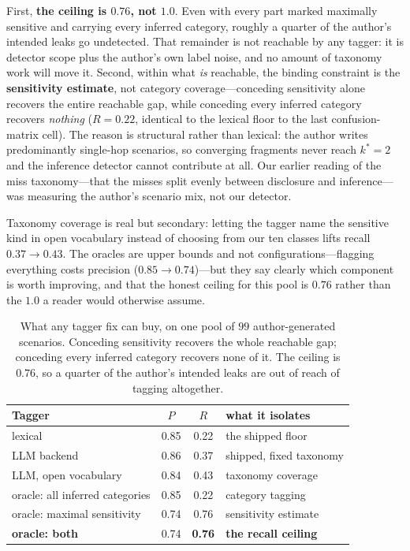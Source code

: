 \documentclass{article}
\begin{document}
First, \textbf{the ceiling is $0.76$, not $1.0$}. Even with every part marked
maximally sensitive and carrying every inferred category, roughly a quarter of the
author's intended leaks go undetected. That remainder is not reachable by any
tagger: it is detector scope plus the author's own label noise, and no amount of
taxonomy work will move it. Second, within what \emph{is} reachable, the binding
constraint is the \textbf{sensitivity estimate}, not category coverage---conceding
sensitivity alone recovers the entire reachable gap, while conceding every inferred
category recovers \emph{nothing} ($R{=}0.22$, identical to the lexical floor to the
last confusion-matrix cell). The reason is structural rather than lexical: the
author writes predominantly single-hop scenarios, so converging fragments never
reach $k^{*}{=}2$ and the inference detector cannot contribute at all. Our earlier
reading of the miss taxonomy---that the misses split evenly between disclosure and
inference---was measuring the author's scenario mix, not our detector.

Taxonomy coverage is real but secondary: letting the tagger name the sensitive kind
in open vocabulary instead of choosing from our ten classes lifts recall
$0.37\to0.43$. The oracles are upper bounds and not configurations---flagging
everything costs precision ($0.85\to0.74$)---but they say clearly which component
is worth improving, and that the honest ceiling for this pool is $0.76$ rather than
the $1.0$ a reader would otherwise assume.

\begin{table}[t]\centering\small
\begin{tabular}{lccl}
\toprule
Tagger & $P$ & $R$ & what it isolates \\
\midrule
lexical & 0.85 & 0.22 & the shipped floor \\
LLM backend & 0.86 & 0.37 & shipped, fixed taxonomy \\
LLM, open vocabulary & 0.84 & 0.43 & taxonomy coverage \\
oracle: all inferred categories & 0.85 & 0.22 & category tagging \\
oracle: maximal sensitivity & 0.74 & 0.76 & sensitivity estimate \\
\textbf{oracle: both} & 0.74 & \textbf{0.76} & \textbf{the recall ceiling} \\
\bottomrule
\end{tabular}
\caption{What any tagger fix can buy, on one pool of $99$ author-generated
scenarios. Conceding sensitivity recovers the whole reachable gap; conceding every
inferred category recovers none of it. The ceiling is $0.76$, so a quarter of the
author's intended leaks are out of reach of tagging altogether.}
\label{tab:ceiling}
\end{table}
\end{document}
